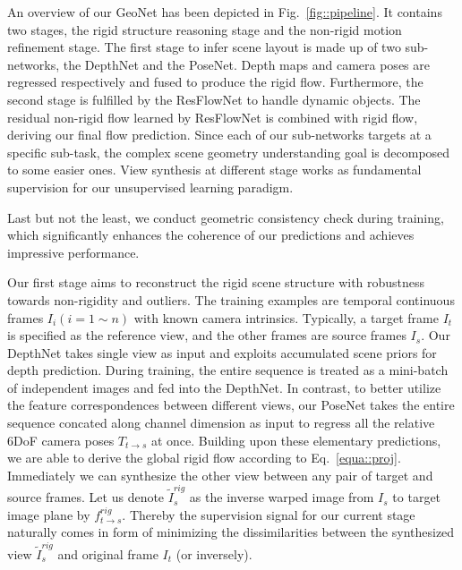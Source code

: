 \documentclass[10pt,twocolumn,letterpaper]{article}
\newcommand{\jpshi}[1]{{{\color{blue} Jianping: #1}}}
\begin{document}
An overview of our GeoNet has been depicted in Fig.~\ref{fig::pipeline}. It contains two stages, the rigid structure reasoning stage and the non-rigid motion refinement stage. The first stage to infer scene layout is made up of two sub-networks, \ie the DepthNet and the PoseNet. Depth maps and camera poses are regressed respectively and fused to produce the rigid flow. Furthermore, the second stage is fulfilled by the ResFlowNet to handle dynamic objects. The residual non-rigid flow learned by ResFlowNet is combined with rigid flow, deriving our final flow prediction. Since each of our sub-networks targets at a specific sub-task, the complex scene geometry understanding goal is decomposed to some easier ones. View synthesis at different stage works as fundamental supervision for our unsupervised learning paradigm. 

Last but not the least, we conduct geometric consistency check during training, which significantly enhances the coherence of our predictions and achieves impressive performance.


Our first stage aims to reconstruct the rigid scene structure with robustness towards non-rigidity and outliers. The training examples are temporal continuous frames $I_{i} (i=1\sim n)$ with known camera intrinsics. Typically, a target frame $I_t$ is specified as the reference view, and the other frames are source frames $I_s$. Our DepthNet takes single view as input and exploits accumulated scene priors for depth prediction. During training, 
the entire sequence is treated as a mini-batch of independent images and fed into the DepthNet.
In contrast, to better utilize the feature correspondences between different views, our PoseNet takes the entire sequence concated along channel dimension as input to regress all the relative 6DoF camera poses $T_{t\to s}$ at once. Building upon these elementary predictions, we are able to derive the global rigid flow according to Eq.~\eqref{equa::proj}. Immediately we can synthesize the other view between any pair of target and source frames. Let us denote $\tilde{I}_s^{rig}$ as the inverse warped image from $I_s$ to target image plane by $f_{t\to s}^{rig}$. 
Thereby the supervision signal for our current stage naturally comes in form of minimizing the dissimilarities between the synthesized view $\tilde{I}_s^{rig}$ and original frame $I_t$ (or inversely).
\end{document}
